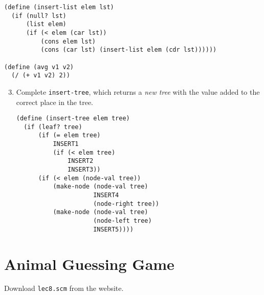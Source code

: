 \begin{verbatim}
(define (insert-list elem lst)
  (if (null? lst)
      (list elem)
      (if (< elem (car lst))
          (cons elem lst)
          (cons (car lst) (insert-list elem (cdr lst))))))

(define (avg v1 v2)
  (/ (+ v1 v2) 2))
\end{verbatim}

\begin{enumerate}
\setcounter{enumi}{2}
\item Complete {\tt insert-tree}, which returns a {\it new tree} with the
value added to the correct place in the tree.
\begin{verbatim}
(define (insert-tree elem tree)
  (if (leaf? tree)
      (if (= elem tree)
          INSERT1
          (if (< elem tree)
              INSERT2
              INSERT3))
      (if (< elem (node-val tree))
          (make-node (node-val tree)
                     INSERT4
                     (node-right tree))
          (make-node (node-val tree)
                     (node-left tree)
                     INSERT5))))
\end{verbatim}
\vspace{2in}

\end{enumerate}

\newpage

\section*{Animal Guessing Game}

Download {\tt lec8.scm} from the website.

